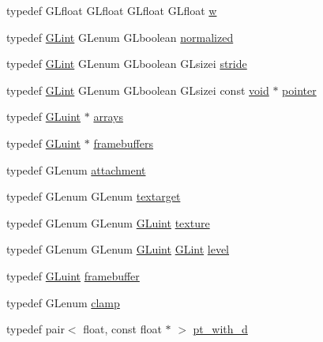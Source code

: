 \begin{DoxyCompactItemize}
\item 
typedef G\+Lfloat G\+Lfloat G\+Lfloat G\+Lfloat \hyperlink{namespacetrimesh_acd577db8a2f95fe39ececb95e98a6c71}{w}
\item 
typedef \hyperlink{namespacetrimesh_aeccc290e30b317c861fb146956528187}{G\+Lint} G\+Lenum G\+Lboolean \hyperlink{namespacetrimesh_a3dae7368e1a76b54d81a4c8abd70559b}{normalized}
\item 
typedef \hyperlink{namespacetrimesh_aeccc290e30b317c861fb146956528187}{G\+Lint} G\+Lenum G\+Lboolean G\+Lsizei \hyperlink{namespacetrimesh_adbcc86014e77656be1a9df7ecaae5f2f}{stride}
\item 
typedef \hyperlink{namespacetrimesh_aeccc290e30b317c861fb146956528187}{G\+Lint} G\+Lenum G\+Lboolean G\+Lsizei const \hyperlink{namespacetrimesh_a784ddfd979e1c579bda795a8edfc3f43}{void} $\ast$ \hyperlink{namespacetrimesh_a406a365150ad981ca5f6faf3f2ec5d91}{pointer}
\item 
typedef \hyperlink{namespacetrimesh_ad2289423ef47b393854afc30451d433b}{G\+Luint} $\ast$ \hyperlink{namespacetrimesh_afadd14df3ec31f9e1e9440ad474f9588}{arrays}
\item 
typedef \hyperlink{namespacetrimesh_ad2289423ef47b393854afc30451d433b}{G\+Luint} $\ast$ \hyperlink{namespacetrimesh_ade07442e8ed85d3bc7a6c427e6b636b6}{framebuffers}
\item 
typedef G\+Lenum \hyperlink{namespacetrimesh_a548b4466ae8f9f5803366fdd5d6b26ea}{attachment}
\item 
typedef G\+Lenum G\+Lenum \hyperlink{namespacetrimesh_af18b54823c03fa8b2b00f98bfbe214c4}{textarget}
\item 
typedef G\+Lenum G\+Lenum \hyperlink{namespacetrimesh_ad2289423ef47b393854afc30451d433b}{G\+Luint} \hyperlink{namespacetrimesh_a52cc6edbb725def35d45d825de68a091}{texture}
\item 
typedef G\+Lenum G\+Lenum \hyperlink{namespacetrimesh_ad2289423ef47b393854afc30451d433b}{G\+Luint} \hyperlink{namespacetrimesh_aeccc290e30b317c861fb146956528187}{G\+Lint} \hyperlink{namespacetrimesh_a4f273d6a2251d340a8657f3574b6a615}{level}
\item 
typedef \hyperlink{namespacetrimesh_ad2289423ef47b393854afc30451d433b}{G\+Luint} \hyperlink{namespacetrimesh_a513a525ef9943f1b0914fdee627c0cfb}{framebuffer}
\item 
typedef G\+Lenum \hyperlink{namespacetrimesh_add94ef6721eddee12fecac8a43c8a912}{clamp}
\item 
typedef pair$<$ float, const float $\ast$ $>$ \hyperlink{namespacetrimesh_ab64100c6e8b0f92c8b80af7e509bd6d9}{pt\+\_\+with\+\_\+d}
\end{DoxyCompactItemize}
